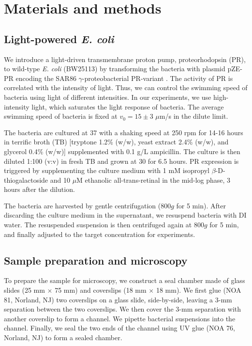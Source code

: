 \documentclass[twocolumn,aps,prx,amsmath,amssymb,longbibliography]{revtex4-2}
\begin{document}
\appendix

\section{Materials and methods} \label{appendix-MM}
\subsection{Light-powered \textit{E. coli}}
We introduce a light-driven transmembrane proton pump, proteorhodopsin (PR), to wild-type \textit{E. coli} (BW25113) by transforming the bacteria with plasmid pZE-PR encoding the SAR86 $\gamma$-proteobacterial PR-variant \cite{Walter2007}. The activity of PR is correlated with the intensity of light. Thus, we can control the swimming speed of bacteria using light of different intensities. In our experiments, we use high-intensity light, which saturates the light response of bacteria. The average swimming speed of bacteria is fixed at $v_0 = 15 \pm 3$ $\mu$m/s in the dilute limit.

The bacteria are cultured at 37 \textcelsius{} with a shaking speed at 250 rpm for 14-16 hours in terrific broth (TB) [tryptone 1.2\% (w/w), yeast extract 2.4\% (w/w), and glycerol 0.4\% (w/w)] supplemented with 0.1 g/L ampicillin. The culture is then diluted 1:100 (v:v) in fresh TB and grown at 30 \textcelsius{} for 6.5 hours. PR expression is triggered by supplementing the culture medium with 1 mM isopropyl $\beta$-D-thiogalactoside and 10  $\mu$M ethanolic all-trans-retinal in the mid-log phase, 3 hours after the dilution.

The bacteria are harvested by gentle centrifugation ($800g$ for 5 min). After discarding the culture medium in the supernatant, we resuspend bacteria with DI water. The resuspended suspension is then centrifuged again at $800g$ for 5 min, and finally adjusted to the target concentration for experiments.

\subsection{Sample preparation and microscopy}

To prepare the sample for microscopy, we construct a seal chamber made of glass slides (25 mm $\times$ 75 mm) and coverslips (18 mm $\times$ 18 mm). We first glue (NOA 81, Norland, NJ) two coverslips on a glass slide, side-by-side, leaving a 3-mm separation between the two coverslips. We then cover the 3-mm separation with another coverslip to form a channel. We pipette bacterial suspensions into the channel. Finally, we seal the two ends of the channel using UV glue (NOA 76, Norland, NJ) to form a sealed chamber.
\end{document}
